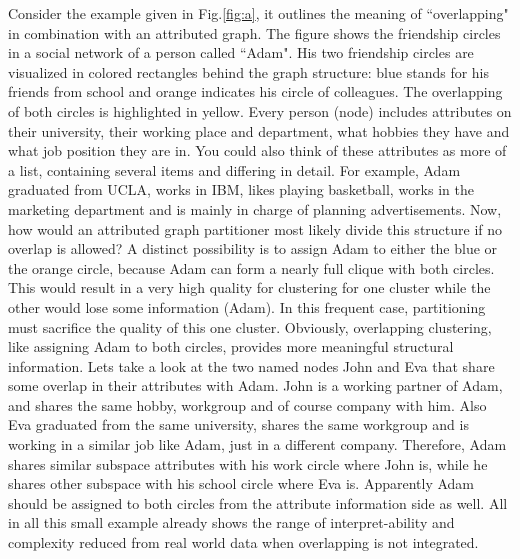 Consider the example given in Fig.\ref{fig:a}, it outlines the meaning of ``overlapping" in combination with an attributed graph. The figure shows the friendship circles in a social network of a person called ``Adam". 
His two friendship circles are visualized in colored rectangles behind the graph structure: blue stands for his friends from school and orange indicates his circle of colleagues. The overlapping of both circles is highlighted in yellow. Every person (node) includes attributes on their university,  their working place and department, what hobbies they have and what job position they are in. %
You could also think of these attributes as more of a list, containing several items and differing in detail.
For example, Adam graduated from UCLA, works in IBM, likes playing basketball, works in the marketing department and is mainly in charge of planning advertisements. Now, how would an attributed graph partitioner most likely divide this structure if no overlap is allowed? A distinct possibility is to assign Adam to either the blue or the orange circle, because Adam can form a nearly full clique with both circles. This would result in a very high quality for clustering for one cluster while the other would lose some information (Adam). In this frequent case, partitioning must sacrifice the quality of this one cluster. Obviously, overlapping clustering, like assigning Adam to both circles, provides more meaningful structural information. Lets take a look at the two named nodes John and Eva that share some overlap in their attributes with Adam. John is a working partner of Adam, and shares the same hobby, workgroup and of course company with him. Also Eva graduated from the same university, shares the same workgroup and is working in a similar job like Adam, just in a different company. Therefore, Adam shares similar subspace attributes with his work circle where John is, while he shares other subspace with his school circle where Eva is. Apparently Adam should be assigned to both circles from the attribute information side as well.
All in all this small example already shows the range of interpret-ability and complexity reduced from real world data when overlapping is not integrated.


